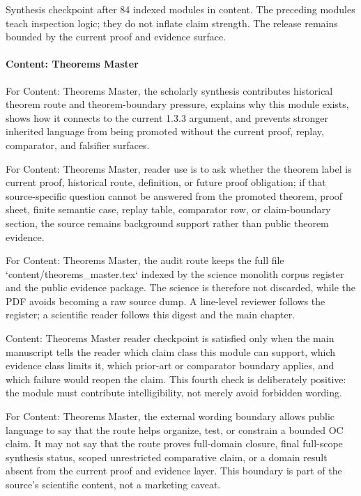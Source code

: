 Synthesis checkpoint after 84 indexed modules in content. The preceding modules teach inspection logic; they do not inflate claim strength. The release remains bounded by the current proof and evidence surface.


\paragraph{Content: Theorems Master}

For Content: Theorems Master, the scholarly synthesis contributes historical theorem route and theorem-boundary pressure, explains why this module exists, shows how it connects to the current 1.3.3 argument, and prevents stronger inherited language from being promoted without the current proof, replay, comparator, and falsifier surfaces.


For Content: Theorems Master, reader use is to ask whether the theorem label is current proof, historical route, definition, or future proof obligation; if that source-specific question cannot be answered from the promoted theorem, proof sheet, finite semantic case, replay table, comparator row, or claim-boundary section, the source remains background support rather than public theorem evidence.


For Content: Theorems Master, the audit route keeps the full file `content/theorems\_master.tex` indexed by the science monolith corpus register and the public evidence package. The science is therefore not discarded, while the PDF avoids becoming a raw source dump. A line-level reviewer follows the register; a scientific reader follows this digest and the main chapter.


Content: Theorems Master reader checkpoint is satisfied only when the main manuscript tells the reader which claim class this module can support, which evidence class limits it, which prior-art or comparator boundary applies, and which failure would reopen the claim. This fourth check is deliberately positive: the module must contribute intelligibility, not merely avoid forbidden wording.


For Content: Theorems Master, the external wording boundary allows public language to say that the route helps organize, test, or constrain a bounded OC claim. It may not say that the route proves full-domain closure, final full-scope synthesis status, scoped unrestricted comparative claim, or a domain result absent from the current proof and evidence layer. This boundary is part of the source's scientific content, not a marketing caveat.


